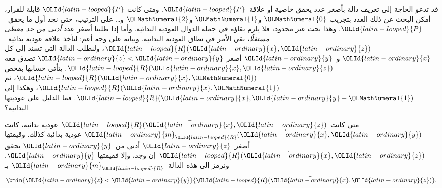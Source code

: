 \documentclass[../../../include/open-logic-section]{subfiles}
\begin{document}

\begin{explain}
قد تدعو الحاجة إلى تعريف دالة بأصغر عدد يحقق خاصية أو
علاقة~$\OLId{latin-looped}{P}$. ومتى كانت $\OLId{latin-looped}{P}$ قابلة للقرار، أمكن البحث عن ذلك العدد
بتجريب $\OLMathNumeral{0}$ و$\OLMathNumeral{1}$ و$\OLMathNumeral{2}$ و… على الترتيب، حتى نجد أول ما
يحقق~$\OLId{latin-looped}{P}$. وهذا بحث غير محدود، فلا يلزم بقاؤه في جملة الدوال
العودية البدائية. وأما إذا طلبنا أصغر عدد
\emph{أدنى من حد معطى مستقلًا}، بقي الأمر في نطاق العودية البدائية.
وبيانه على وجه أعم: لنأخذ علاقة عودية بدائية~$\OLId{latin-looped}{R}(\OLId{latin-ordinary}{x},\OLId{latin-ordinary}{z})$،
ولنطلب الدالة التي تسند إلى كل $\OLId{latin-ordinary}{x}$ و~$\OLId{latin-ordinary}{y}$ أصغر $\OLId{latin-ordinary}{z}<\OLId{latin-ordinary}{y}$ تصدق معه
$\OLId{latin-looped}{R}(\OLId{latin-ordinary}{x},\OLId{latin-ordinary}{z})$. يتأتى حسابها بفحص $\OLId{latin-looped}{R}(\OLId{latin-ordinary}{x},\OLMathNumeral{0})$، ثم $\OLId{latin-looped}{R}(\OLId{latin-ordinary}{x},\OLMathNumeral{1})$، وهكذا إلى
$\OLId{latin-looped}{R}(\OLId{latin-ordinary}{x},\OLId{latin-ordinary}{y}-\OLMathNumeral{1})$. فما الدليل على عوديتها البدائية؟
\end{explain}

\begin{prop}
متى كانت $\OLId{latin-looped}{R}(\vec \OLId{latin-ordinary}{x},\OLId{latin-ordinary}{z})$ عودية بدائية، كانت $\OLId{latin-ordinary}{m}_\OLId{latin-looped}{R}(\vec{\OLId{latin-ordinary}{x}},\OLId{latin-ordinary}{y})$
عودية بدائية كذلك. وقيمتها أصغر~$\OLId{latin-ordinary}{z}$ أدنى من~$\OLId{latin-ordinary}{y}$ يحقق
$\OLId{latin-looped}{R}(\vec \OLId{latin-ordinary}{x},\OLId{latin-ordinary}{z})$ إن وجد، وإلا فقيمتها $\OLId{latin-ordinary}{y}$. ونرمز إلى هذه الدالة~$\OLId{latin-ordinary}{m}_\OLId{latin-looped}{R}$ بـ
\[
\bmin{\OLId{latin-ordinary}{z} < \OLId{latin-ordinary}{y}}{\OLId{latin-looped}{R}(\vec{\OLId{latin-ordinary}{x}}, \OLId{latin-ordinary}{z})}.
\]
\end{prop}
\end{document}
